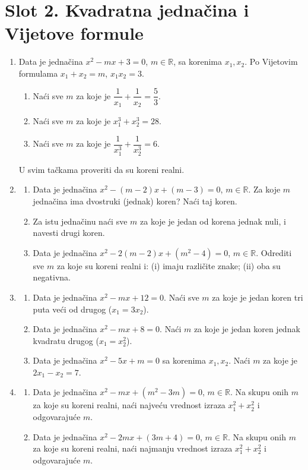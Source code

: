 \section*{Slot 2. Kvadratna jednačina i Vijetove formule}
\begin{enumerate}[label=\arabic*.]
\item Data je jednačina $x^{2}-mx+3=0$, $m\in\mathbb{R}$, sa korenima $x_1,x_2$. Po Vijetovim formulama $x_1+x_2=m$, $x_1x_2=3$.
\begin{enumerate}[label=\alph*)]
\item Naći sve $m$ za koje je $\dfrac{1}{x_1}+\dfrac{1}{x_2}=\dfrac{5}{3}$.
\item Naći sve $m$ za koje je $x_1^{3}+x_2^{3}=28$.
\item Naći sve $m$ za koje je $\dfrac{1}{x_1^{3}}+\dfrac{1}{x_2^{3}}=6$.
\end{enumerate}
U svim tačkama proveriti da su koreni realni.

\item \begin{enumerate}[label=\alph*)]
\item Data je jednačina $x^{2}-(m-2)x+(m-3)=0$, $m\in\mathbb{R}$. Za koje $m$ jednačina ima dvostruki (jednak) koren? Naći taj koren.
\item Za istu jednačinu naći sve $m$ za koje je jedan od korena jednak nuli, i navesti drugi koren.
\item Data je jednačina $x^{2}-2(m-2)x+(m^{2}-4)=0$, $m\in\mathbb{R}$. Odrediti sve $m$ za koje su koreni realni i: (i) imaju različite znake; (ii) oba su negativna.
\end{enumerate}

\item \begin{enumerate}[label=\alph*)]
\item Data je jednačina $x^{2}-mx+12=0$. Naći sve $m$ za koje je jedan koren tri puta veći od drugog ($x_1=3x_2$).
\item Data je jednačina $x^{2}-mx+8=0$. Naći $m$ za koje je jedan koren jednak kvadratu drugog ($x_1=x_2^{2}$).
\item Data je jednačina $x^{2}-5x+m=0$ sa korenima $x_1,x_2$. Naći $m$ za koje je $2x_1-x_2=7$.
\end{enumerate}

\item \begin{enumerate}[label=\alph*)]
\item Data je jednačina $x^{2}-mx+(m^{2}-3m)=0$, $m\in\mathbb{R}$. Na skupu onih $m$ za koje su koreni realni, naći najveću vrednost izraza $x_1^{2}+x_2^{2}$ i odgovarajuće $m$.
\item Data je jednačina $x^{2}-2mx+(3m+4)=0$, $m\in\mathbb{R}$. Na skupu onih $m$ za koje su koreni realni, naći najmanju vrednost izraza $x_1^{2}+x_2^{2}$ i odgovarajuće $m$.
\end{enumerate}


\end{enumerate}
